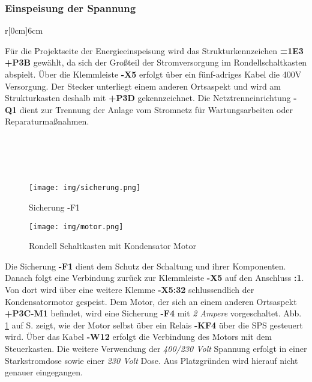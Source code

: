 \documentclass[12pt,a4paper]{scrartcl}	%
\begin{document}
\subsubsection{Einspeisung der Spannung}
\begin{wrapfigure}[]{r}[0cm]{6cm}
	\caption{Einspeisung}
	\label{fig:bild}
\end{wrapfigure}
Für die Projektseite der Energieeinspeisung wird das Strukturkennzeichen \textbf{=1E3 +P3B} gewählt, da sich der Großteil der Stromversorgung im Rondellschaltkasten abspielt.
Über die Klemmleiste \mbox{\textbf{-X5}} erfolgt über ein fünf-adriges Kabel die 400V Versorgung. Der Stecker unterliegt einem anderen Ortsaspekt und wird am Strukturkasten deshalb mit \textbf{+P3D} gekennzeichnet.
Die Netztrenneinrichtung \mbox{\textbf{-Q1}} dient zur Trennung der Anlage vom Stromnetz für Wartungsarbeiten oder Reparaturmaßnahmen.
\\
\\
\\
\\
\\
\begin{figure}[htb]
	\centering
	\texttt{[image: img/sicherung.png]}
	\caption{Sicherung -F1}
	
\end{figure}
\begin{figure}[htb]
	\centering
	\texttt{[image: img/motor.png]}
	\caption{Rondell Schaltkasten mit Kondensator Motor}
	\label{motor}
\end{figure}
Die Sicherung \textbf{-F1} dient dem Schutz der Schaltung und ihrer Komponenten. Danach folgt eine Verbindung zurück zur Klemmleiste \mbox{\textbf{-X5}} auf den Anschluss \mbox{\textbf{:1}}. Von dort wird über eine weitere Klemme \mbox{\textbf{-X5:32}} schlussendlich der Kondensatormotor gespeist. Dem Motor, der sich an einem anderen Ortsaspekt \mbox{\textbf{+P3C-M1}} befindet, wird eine Sicherung \mbox{\textbf{-F4}} mit \textit{2 Ampere} vorgeschaltet. Abb. \ref{motor} auf S. \pageref{motor} zeigt, wie der Motor selbst über ein Relais \mbox{\textbf{-KF4}} über die SPS gesteuert wird. Über das Kabel \mbox{\textbf{-W12}} erfolgt die Verbindung des Motors mit dem Steuerkasten.
Die weitere Verwendung der \textit{400/230 Volt} Spannung erfolgt in einer Starkstromdose sowie einer \textit{230 Volt} Dose. Aus Platzgründen wird hierauf nicht genauer eingegangen.
\newpage
\end{document}
